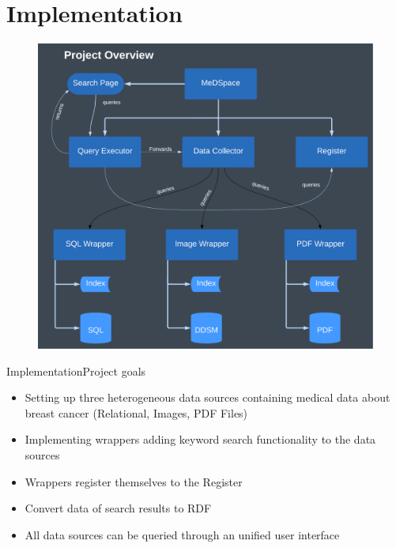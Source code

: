 \section{Implementation}
\begin{frame}
\begin{figure}[H]
	\begin{center}
	\vspace*{-0.35cm}
		\includegraphics[scale=0.3]{figures/MeDSpace-Overview.pdf}
	\end{center}
	\label{MeDSpaceOverview}
\end{figure}
\end{frame}

\begin{frame}{Implementation}{Project goals}
    \begin{itemize}
    \item Setting up three heterogeneous data sources containing medical data about breast cancer (Relational, Images, PDF Files)
    \item Implementing wrappers adding keyword search functionality to the data sources
    \item Wrappers register themselves to the Register
    \item Convert data of search results to RDF
    \item All data sources can be queried through an unified user interface  
    \end{itemize}
\end{frame}

